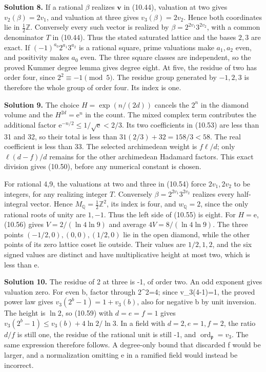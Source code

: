 \documentclass[
  11pt,
  a4paper,
]{article}
\begin{document}
\textbf{Solution 8.} If a rational \(\beta\) realizes \(\boldsymbol v\)
in (10.44), valuation at two gives \(v_2(\beta)=2v_1\), and valuation at
three gives \(v_3(\beta)=2v_2\). Hence both coordinates lie in
\(\tfrac12\mathbb Z\). Conversely every such vector is realized by
\(\beta=2^{2v_1}3^{2v_2}\), with a common denominator \(T\) in (10.44).
Thus the stated saturated lattice and the bases \(2,3\) are exact. If
\((-1)^{a_0}2^{a_1}3^{a_2}\) is a rational square, prime valuations make
\(a_1,a_2\) even, and positivity makes \(a_0\) even. The three square
classes are independent, so the proved Kummer degree lemma gives degree
eight. At five, the residue of two has order four, since
\(2^2\equiv-1\pmod5\). The residue group generated by \(-1,2,3\) is
therefore the whole group of order four. Its index is one.

\textbf{Solution 9.} The choice \(H=\exp(n/(2d))\) cancels the \(2^n\)
in the diamond volume and the \(H^{2d}=\mathrm e^n\) in the count. The
mixed complex term contributes the additional factor
\(\mathrm e^{-n/2}\le1/\sqrt{\mathrm e}<2/3\). Its two coefficients in
(10.53) are less than 31 and 32, so their total is less than
\(31(2/3)+32=158/3<58\). The real coefficient is less than 33. The
selected archimedean weight is \(f\ell/d\); only \(\ell(d-f)/d\) remains
for the other archimedean Hadamard factors. This exact division gives
(10.50), before any numerical constant is chosen.

For rational 4,9, the valuations at two and three in (10.54) force
\(2v_1,2v_2\) to be integers, for any realizing integer \(T\).
Conversely \(\beta=2^{2v_1}3^{2v_2}\) realizes every half-integral
vector. Hence \(M_{\mathbb Q}=\tfrac12\mathbb Z^2\), its index is four,
and \(w_{\mathbb Q}=2\), since the only rational roots of unity are
\(1,-1\). Thus the left side of (10.55) is eight. For \(H=\mathrm e\),
(10.56) gives \(V=2/(\ln4\ln9)\) and average \(4V=8/(\ln4\ln9)\). The
three points \((-1/2,0),(0,0),(1/2,0)\) lie in the open diamond, while
the other points of its zero lattice coset lie outside. Their values are
\(1/2,1,2\), and the six signed values are distinct and have
multiplicative height at most two, which is less than \(\mathrm e\).

\textbf{Solution 10.} The residue of 2 at three is -1, of order two. An
odd exponent gives valuation zero. For even b, factor through 2\^{}2=4;
since v\_3(4-1)=1, the proved power law gives \(v_3(2^b-1)=1+v_3(b)\),
also for negative b by unit inversion. The height is \(\ln2\), so
(10.59) with \(d=e=f=1\) gives \(v_3(2^b-1)\le v_3(b)+4\ln2/\ln3\). In a
field with \(d=2,e=1,f=2\), the ratio \(d/f\) is still one, the residue
of the rational unit is still -1, and
\(\operatorname{ord}_{\mathfrak p}=v_3\). The same expression therefore
follows. A degree-only bound that discarded f would be larger, and a
normalization omitting e in a ramified field would instead be incorrect.
\end{document}
